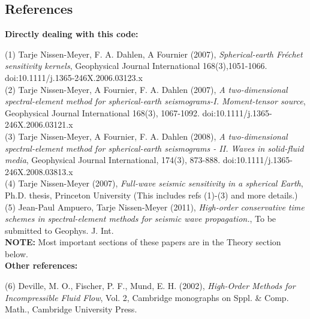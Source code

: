 \documentclass[11pt,letter,fleqn,english,notitlepage]{article}
\begin{document}
\subsection{References}

\noindent \textbf{Directly dealing with this code:}\vspace*{0.2cm}

(1) Tarje Nissen-Meyer, F. A. Dahlen, A Fournier (2007),
\textit{Spherical-earth Fr\'{e}chet sensitivity kernels},        
Geophysical Journal International 168(3),1051-1066. 
doi:10.1111/j.1365-246X.2006.03123.x                \\
                                                        
(2) Tarje Nissen-Meyer, A Fournier, F. A. Dahlen (2007), 
\textit{A two-dimensional spectral-element method for
spherical-earth seismograms-I. Moment-tensor source}, 
Geophysical Journal International 168(3), 1067-1092. 
doi:10.1111/j.1365-246X.2006.03121.x                 \\
                                                       
(3) Tarje Nissen-Meyer, A Fournier, F. A. Dahlen (2008),  
\textit{A two-dimensional spectral-element method for   
spherical-earth seismograms - II. Waves in solid-fluid media},
Geophysical Journal International, 174(3), 873-888.
doi:10.1111/j.1365-246X.2008.03813.x\\

(4) Tarje Nissen-Meyer (2007),
\textit{Full-wave seismic sensitivity in a spherical Earth},
Ph.D. thesis, Princeton University
(This includes refs (1)-(3) and more details.)\\

(5) Jean-Paul Ampuero, Tarje Nissen-Meyer (2011),
\textit{High-order conservative time schemes in spectral-element methods 
for seismic wave propagation.}, To be submitted to Geophys. J. Int.\\

\noindent \textbf{NOTE:} Most important sections of these papers are in the Theory section below.\\

\noindent \textbf{Other references:}\vspace*{0.2cm}

(6) Deville, M. O., Fischer, P. F., Mund, E. H. (2002), 
\textit{High-Order Methods for Incompressible Fluid Flow}, 
Vol. 2, Cambridge monographs on Sppl. \& Comp. Math., Cambridge University Press.\\
\end{document}

